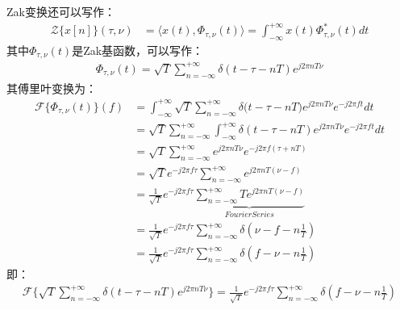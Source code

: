 \documentclass[12pt,a4paper]{article}%
\begin{document}
	Zak变换还可以写作：
	\begin{equation}
		\label{eq4}
		\begin{aligned}
			\mathcal{Z}\{x[n]\}(\tau, \nu) &= \langle x(t),\Phi_{\tau,\nu}(t)\rangle=\int_{-\infty}^{+\infty}x(t)\Phi_{\tau,\nu}^{*}(t)dt
		\end{aligned}
	\end{equation}
	其中$\Phi_{\tau,\nu}(t)$是Zak基函数，可以写作：
	\begin{equation}
		\label{eq5}
		\begin{aligned}
			\Phi_{\tau,\nu}(t) = \sqrt{T}\sum_{n=-\infty}^{+\infty}\delta(t-\tau-nT)e^{j2\pi nT \nu}
		\end{aligned}
	\end{equation}
	其傅里叶变换为：
	\begin{equation}
		\label{eq6}
		\begin{aligned}
			\mathcal{F}\{\Phi_{\tau,\nu}(t)\}(f)&=\int_{-\infty}^{+\infty}\sqrt{T}\sum_{n=-\infty}^{+\infty}\delta\Big(t-\tau-nT\Big)e^{j2\pi nT\nu}e^{-j2\pi ft}dt \\
			&=\sqrt{T}\sum_{n=-\infty}^{+\infty}\int_{-\infty}^{+\infty}\delta(t-\tau-nT)e^{j2\pi nT\nu}e^{-j2\pi ft}dt \\
			&=\sqrt{T}\sum_{n=-\infty}^{+\infty}e^{j2\pi nT\nu}e^{-j2\pi f\left(\tau+nT\right)} \\
			&=\sqrt{T}e^{-j2\pi f\tau}\sum_{n=-\infty}^{+\infty}e^{j2\pi nT\left(\nu-f\right)} \\
			&=\frac{1}{\sqrt{T}}e^{-j2\pi f\tau}\underbrace{\sum_{n=-\infty}^{+\infty}Te^{j2\pi nT\left(\nu-f\right)}}_{FourierSeries} \\
			&=\frac{1}{\sqrt{T}}e^{-j2\pi f\tau}\sum_{n=-\infty}^{+\infty}\delta\left(\nu-f-n\frac{1}{T}\right) \\
			&=\frac{1}{\sqrt{T}}e^{-j2\pi f\tau}\sum_{n=-\infty}^{+\infty}\delta\left(f-\nu-n\frac{1}{T}\right)
		\end{aligned}
	\end{equation}
	即：
	\begin{equation}
		\label{eq7}
		\begin{aligned}
			\mathcal{F}\{\sqrt{T}\sum_{n=-\infty}^{+\infty}\delta(t-\tau-nT)e^{j2\pi nT \nu}\} = \frac{1}{\sqrt{T}}e^{-j2\pi f\tau}\sum_{n=-\infty}^{+\infty}\delta\left(f-\nu-n\frac{1}{T}\right)
		\end{aligned}
	\end{equation}
\end{document}
